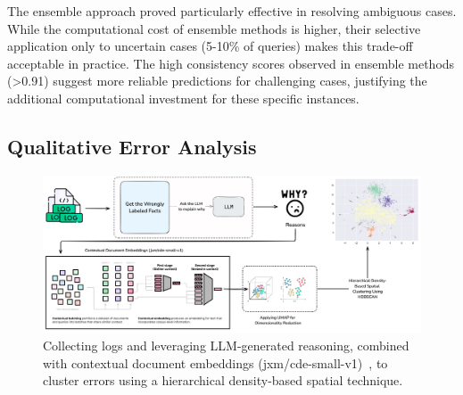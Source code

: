 The ensemble approach proved particularly effective in resolving ambiguous cases.
While the computational cost of ensemble methods is higher, their selective application only to uncertain cases (5-10\% of queries) makes this trade-off acceptable in practice.
The high consistency scores observed in ensemble methods (>0.91) suggest more reliable predictions for challenging cases, justifying the additional computational investment for these specific instances.

\subsection{Qualitative Error Analysis}\label{subsec:empirical-evaluation:discussion-of-results:error-analysis}
\begin{figure}[ht!]
    \centering
    \begin{minipage}[b]{\textwidth}
        \centering
        \includegraphics[width=\textwidth]{res/clustering}
    \end{minipage}
    \caption{Collecting logs and leveraging LLM-generated reasoning, combined with contextual document embeddings (jxm/cde-small-v1)~\cite{morris2024contextualdocumentembeddings}, to cluster errors using a hierarchical density-based spatial technique.}
    \label{fig:error-clustering-task}
\end{figure}

